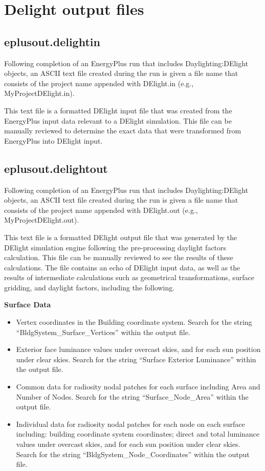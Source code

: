 \section{Delight output files}\label{delight-output-files}

\subsection{eplusout.delightin}\label{eplusout.delightin}

Following completion of an EnergyPlus run that includes Daylighting:DElight objects, an ASCII text file created during the run is given a file name that consists of the project name appended with DElight.in (e.g., MyProjectDElight.in).

This text file is a formatted DElight input file that was created from the EnergyPlus input data relevant to a DElight simulation. This file can be manually reviewed to determine the exact data that were transformed from EnergyPlus into DElight input.

\subsection{eplusout.delightout}\label{eplusout.delightout}

Following completion of an EnergyPlus run that includes Daylighting:DElight objects, an ASCII text file created during the run is given a file name that consists of the project name appended with DElight.out (e.g., MyProjectDElight.out).

This text file is a formatted DElight output file that was generated by the DElight simulation engine following the pre-processing daylight factors calculation. This file can be manually reviewed to see the results of these calculations. The file contains an echo of DElight input data, as well as the results of intermediate calculations such as geometrical transformations, surface gridding, and daylight factors, including the following.

\textbf{Surface Data}

\begin{itemize}
\item
  Vertex coordinates in the Building coordinate system. Search for the string ``BldgSystem\_Surface\_Vertices'' within the output file.
\item
  Exterior face luminance values under overcast skies, and for each sun position under clear skies. Search for the string ``Surface Exterior Luminance'' within the output file.
\item
  Common data for radiosity nodal patches for each surface including Area and Number of Nodes. Search for the string ``Surface\_Node\_Area'' within the output file.
\item
  Individual data for radiosity nodal patches for each node on each surface including: building coordinate system coordinates; direct and total luminance values under overcast skies, and for each sun position under clear skies. Search for the string ``BldgSystem\_Node\_Coordinates'' within the output file.
\end{itemize}

